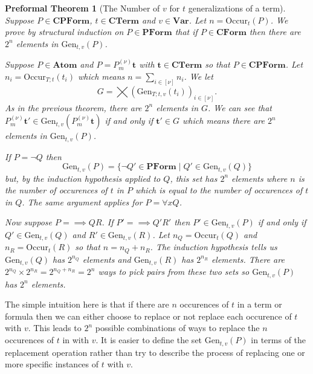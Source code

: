 \documentclass[oneside, 12pt]{book}
\theoremstyle{break}
\newtheorem{preformal definition}[definition]{Preformal Definition}
\newtheorem{preformal theorem}[theorem]{Preformal Theorem}
\newcommand{\bv}[1]{\boldsymbol{#1}}
\begin{document}
		\begin{preformal theorem}[The Number of $v$ for $t$ generalizations of a term]
			Suppose $P \in \textbf{CPForm}$, $t\in \textbf{CTerm}$ and $v \in \textbf{Var}$.
			Let $n = \text{Occur}_t(P)$.
			We prove by structural induction on $P\in\textbf{PForm}$ that if $P \in \textbf{CForm}$ then there are $2^n$ elements in $\text{Gen}_{t, v}(P)$.
			
			Suppose $P \in \textbf{Atom}$ and $P = P_m^{(\nu)}\bv{t}$ with $\bv{t}\in \textbf{CTerm}$ so that $P \in \textbf{CPForm}$.
			Let $n_i = \text{Occur}_{T;t}(t_i)$ which means $n = \sum_{i\in [\nu]} n_i$.
			We let
			\begin{equation*}
				G = \bigtimes (\text{Gen}_{T;t, v}(t_i))_{i\in [\nu]}.
			\end{equation*}
			As in the previous theorem, there are $2^n$ elements in $G$.
			We can see that $P_m^{(\nu)} \bv{t}' \in \text{Gen}_{t, v}(P_{m}^{(\nu)}\bv{t})$ if and only if $\bv{t}' \in G$ which means there are $2^n$ elements in $\text{Gen}_{t, v}(P)$.
			
			If $P = \lnot Q$ then
			\begin{equation*}
				\text{Gen}_{t, v}(P) = \{\lnot Q' \in \textbf{PForm} \mid Q' \in \text{Gen}_{t, v}(Q)\}
			\end{equation*}
			but, by the induction hypothesis applied to $Q$, this set has $2^n$ elements where $n$ is the number of occurences of $t$ in $P$ which is equal to the number of occurences of $t$ in $Q$.
			The same argument applies for $P = \forall x Q$.
			
			Now suppose $P = \implies QR$.
			If $P' = \implies Q'R'$ then $P' \in \text{Gen}_{t, v}(P)$ if and only if $Q' \in \text{Gen}_{t, v}(Q)$ and $R' \in \text{Gen}_{t, v}(R)$. 
			Let $n_Q = \text{Occur}_t(Q)$ and $n_R = \text{Occur}_t(R)$ so that $n = n_Q + n_R$.
			The induction hypothesis tells us $\text{Gen}_{t, v}(Q)$ has $2^{n_Q}$ elements and $\text{Gen}_{t, v}(R)$ has $2^{n_R}$ elements.
			There are $2^{n_Q} \times 2^{n_R} = 2^{n_Q + n_R} = 2^n$ ways to pick pairs from these two sets so $\text{Gen}_{t, v}(P)$ has $2^n$ elements.
		\end{preformal theorem}		
		
		The simple intuition here is that if there are $n$ occurences of $t$ in a term or formula then we can either choose to replace or not replace each occurence of $t$ with $v$.
		This leads to $2^n$ possible combinations of ways to replace the $n$ occurences of $t$ in with $v$.
		It is easier to define the set $\text{Gen}_{t, v}(P)$ in terms of the replacement operation rather than try to describe the process of replacing one or more specific instances of $t$ with $v$.
		
\end{document}
